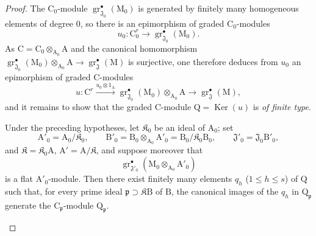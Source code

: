 \begin{proof}
The $\mathrm{C}_0$-module $\operatorname{gr}^\bullet_{\mathfrak{J}_0}(\mathrm{M}_0)$ is generated by finitely many homogeneous elements of degree $0$, so there is an epimorphism of graded $\mathrm{C}_0$-modules
\[
  u_0:\mathrm{C}_0^r\longrightarrow\operatorname{gr}^\bullet_{\mathfrak{J}_0}(\mathrm{M}_0).
\]
As $\mathrm{C}=\mathrm{C}_0\otimes_{\mathrm{A}_0}\mathrm{A}$ and the canonical homomorphism $\operatorname{gr}^\bullet_{\mathfrak{J}_0}(\mathrm{M}_0)\otimes_{\mathrm{A}_0}\mathrm{A}\to\operatorname{gr}^\bullet_\mathfrak{J}(\mathrm{M})$ is surjective, one therefore deduces from $u_0$ an epimorphism of graded $\mathrm{C}$-modules
\[
  u:\mathrm{C}^r\xrightarrow{u_0\otimes 1_{\mathrm{A}}}\operatorname{gr}^\bullet_{\mathfrak{J}_0}(\mathrm{M}_0)\otimes_{\mathrm{A}_0}\mathrm{A}\longrightarrow\operatorname{gr}^\bullet_\mathfrak{J}(\mathrm{M}),
\]
and it remains to show that the graded $\mathrm{C}$-module
$\mathrm{Q}=\operatorname{Ker}(u)$ is \emph{of finite type}.
\\[0.4\baselineskip]
\begin{lemma}[11.2.9.6]
\label{IV.11.2.9.6}
Under the preceding hypotheses, let $\mathfrak K_0$ be an ideal of $\mathrm{A}_0$; set
\[
  \mathrm{A}'_0=\mathrm{A}_0/\mathfrak K_0,\qquad
  \mathrm{B}'_0=\mathrm{B}_0\otimes_{\mathrm{A}_0}\mathrm{A}'_0
  =\mathrm{B}_0/\mathfrak K_0\mathrm{B}_0,\qquad
  \mathfrak{J}'_0=\mathfrak{J}_0\mathrm{B}'_0,
\]
and $\mathfrak K=\mathfrak K_0\mathrm{A}$, $\mathrm{A}'=\mathrm{A}/\mathfrak K$, and suppose moreover that
\[
  \operatorname{gr}^\bullet_{\mathfrak{J}'_0}
  (\mathrm{M}_0\otimes_{\mathrm{A}_0}\mathrm{A}'_0)
\]
is a flat $\mathrm{A}'_0$-module. Then there exist finitely many elements $q_h$ \textup{(}$1\leqslant h\leqslant s$\textup{)} of $\mathrm{Q}$ such that, for every prime ideal $\mathfrak{p}\supset\mathfrak K\mathrm{B}$ of $\mathrm{B}$, the canonical images of the $q_h$ in $\mathrm{Q}_\mathfrak{p}$ generate the $\mathrm{C}_\mathfrak{p}$-module $\mathrm{Q}_\mathfrak{p}$.
\end{lemma}


\end{proof}
